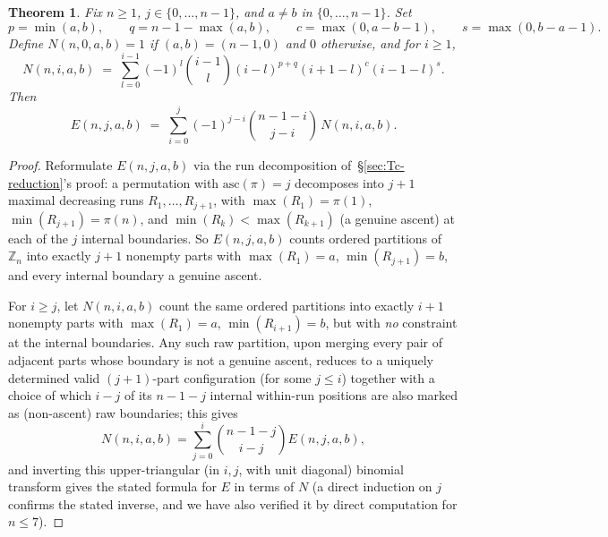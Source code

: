 \documentclass[11pt,a4paper]{amsart}
\newtheorem{theorem}{Theorem}[section]
\newcommand{\Z}{\mathbb{Z}}
\newcommand{\1}{\mathbf{1}}
\begin{document}
\begin{theorem}\label{thm:E-explicit}
Fix $n\ge1$, $j\in\{0,\dots,n-1\}$, and $a\ne b$ in $\{0,\dots,n-1\}$. Set
\[
p=\min(a,b),\qquad q=n-1-\max(a,b),\qquad c=\max(0,a-b-1),\qquad s=\max(0,b-a-1).
\]
Define $N(n,0,a,b)=1$ if $(a,b)=(n-1,0)$ and $0$ otherwise, and for $i\ge1$,
\[
N(n,i,a,b) \;=\; \sum_{l=0}^{i-1}(-1)^l\binom{i-1}{l}(i-l)^{p+q}(i+1-l)^c(i-1-l)^s.
\]
Then
\[
E(n,j,a,b) \;=\; \sum_{i=0}^{j}(-1)^{j-i}\binom{n-1-i}{j-i}\,N(n,i,a,b).
\]
\end{theorem}
\begin{proof}
Reformulate $E(n,j,a,b)$ via the run decomposition of~\S\ref{sec:Tc-reduction}'s proof: a permutation with $\mathrm{asc}(\pi)=j$ decomposes into $j+1$ maximal decreasing runs $R_1,\dots,R_{j+1}$, with $\max(R_1)=\pi(1)$, $\min(R_{j+1})=\pi(n)$, and $\min(R_k)<\max(R_{k+1})$ (a genuine ascent) at each of the $j$ internal boundaries. So $E(n,j,a,b)$ counts ordered partitions of $\Z_n$ into exactly $j+1$ nonempty parts with $\max(R_1)=a$, $\min(R_{j+1})=b$, and every internal boundary a genuine ascent.

For $i\ge j$, let $N(n,i,a,b)$ count the same ordered partitions into exactly $i+1$ nonempty parts with $\max(R_1)=a$, $\min(R_{i+1})=b$, but with \emph{no} constraint at the internal boundaries. Any such raw partition, upon merging every pair of adjacent parts whose boundary is not a genuine ascent, reduces to a uniquely determined valid $(j+1)$-part configuration (for some $j\le i$) together with a choice of which $i-j$ of its $n-1-j$ internal within-run positions are also marked as (non-ascent) raw boundaries; this gives
\[
N(n,i,a,b) = \sum_{j=0}^i \binom{n-1-j}{i-j}E(n,j,a,b),
\]
and inverting this upper-triangular (in $i,j$, with unit diagonal) binomial transform gives the stated formula for $E$ in terms of $N$ (a direct induction on $j$ confirms the stated inverse, and we have also verified it by direct computation for $n\le7$).


\end{proof}
\end{document}
